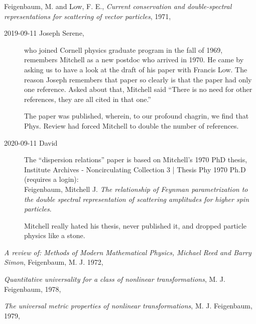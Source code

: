 {Feigenbaum, M. and Low, F. E.},
  {\em Current conservation and double-spectral representations for scattering of vector particles},
{1971},
\begin{description}
  \item[2019-09-11 Joseph Serene,]
who joined Cornell physics graduate program in the fall of 1969,
remembers Mitchell as a new postdoc who arrived in
1970. He came by asking us to have a look at the draft of his paper with
{Francis Low}.
The reason Joseph remembers that paper so clearly is that the paper had
only one reference. Asked about that, Mitchell said ``There is no need for
other references, they are all cited in that one.''

The paper was published, wherein, to our profound chagrin,
we find that Phys. Review had forced Mitchell to double the number of
references.
  \item[2020-09-11 David]
The ``dispersion relations'' paper is
based on Mitchell's 1970 PhD thesis,
Institute Archives - Noncirculating Collection 3 |
{Thesis Phy 1970 Ph.D}
(requires a login):
\\
Feigenbaum, Mitchell J.
{\em The relationship of Feynman parametrization to the double spectral
representation of scattering amplitudes for higher spin particles}.

Mitchell really hated his thesis, never published it, and dropped
particle physics like a stone.
\end{description}

{\em A review of:
{Methods of Modern Mathematical Physics, Michael Reed and Barry Simon}},
{Feigenbaum, M. J.}
{1972},

{\em Quantitative universality for a class of nonlinear transformations},
{M. J. Feigenbaum},
{1978},

{\em The universal metric properties of nonlinear transformations},
{M. J. Feigenbaum},
{1979},

